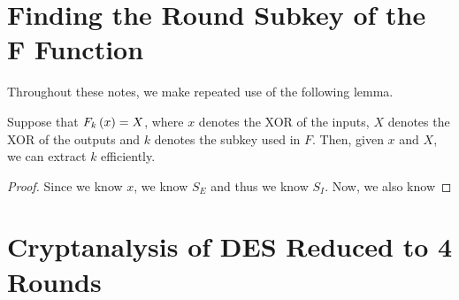 \documentclass[twoside]{article}
\begin{document}



\section{Finding the Round Subkey of the F Function}

Throughout these notes, we make repeated use of the following lemma.

\begin{lemma}
    \label{lem:Fk}
    Suppose that \(F_k\left(x\right) = X\), where \(x\) denotes the XOR of the inputs,
    \(X\) denotes the XOR of the outputs and \(k\) denotes the subkey used in
    \(F\). Then, given \(x\) and \(X\), we can extract \(k\) efficiently.
\end{lemma}
\begin{proof}
    Since we know \(x\), we know \(S_E\) and thus we know \(S_I\). Now, we also
    know  
\end{proof}

\section{Cryptanalysis of DES Reduced to 4 Rounds}
\end{document}
